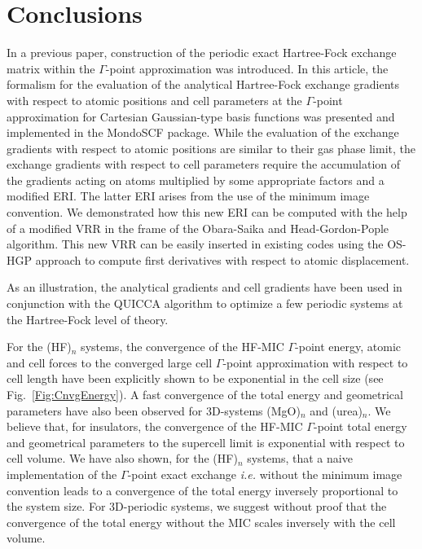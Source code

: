 \documentclass[prl,preprint,doublespace]{revtex4} %
\begin{document}
\section{Conclusions}\label{Sec:Conclusions}

In a previous paper, construction of the periodic exact Hartree-Fock exchange 
matrix within the $\Gamma$-point approximation
was introduced. In this article, the formalism for the evaluation of 
the analytical Hartree-Fock exchange gradients with respect 
to atomic positions and cell parameters at 
the $\Gamma$-point approximation for Cartesian Gaussian-type basis functions 
was presented and implemented in the {\sc MondoSCF} package. 
While the evaluation of the exchange gradients with respect to atomic positions are similar to their 
gas phase limit, the exchange gradients with respect to cell parameters require the accumulation of 
the gradients acting on atoms multiplied by some appropriate factors and a 
modified ERI. The latter ERI arises from the use of the minimum image convention. 
We demonstrated how this new ERI can be computed with the help of a modified VRR 
in the frame of the Obara-Saika and Head-Gordon-Pople algorithm. This new VRR can
be easily inserted in existing codes using the OS-HGP approach to compute 
first derivatives with respect to atomic displacement. 

As an illustration, the analytical gradients and cell gradients have been used 
in conjunction with the QUICCA algorithm to optimize a few periodic systems at 
the Hartree-Fock level of theory. 

For the (HF)$_n$ systems, the convergence of the HF-MIC $\Gamma$-point energy, 
atomic and cell forces to the converged large cell $\Gamma$-point approximation
with respect to cell length have been explicitly shown to be exponential 
in the cell size (see Fig.~\ref{Fig:CnvgEnergy}). 
A fast convergence of the total energy and geometrical parameters
have also been observed for 3D-systems (MgO)$_n$ and (urea)$_n$. We believe
that, for insulators, the convergence of the HF-MIC $\Gamma$-point total energy 
and geometrical parameters to the supercell limit is exponential 
with respect to cell volume.
We have also shown, for the (HF)$_n$ systems, that a naive implementation of 
the $\Gamma$-point exact exchange {\em i.e.} without the minimum image convention 
leads to a convergence of the total energy inversely proportional to 
the system size. For 3D-periodic systems, we suggest without proof that the convergence 
of the total energy without the MIC scales inversely with the 
cell volume.
\end{document}
